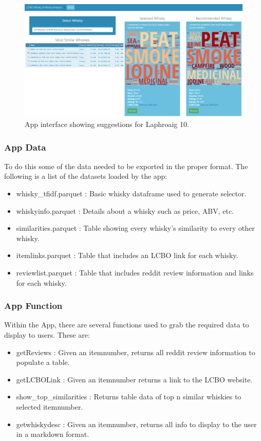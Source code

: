 \documentclass{article}
\begin{document}
\begin{figure}[h]
\includegraphics[width=\textwidth]{app}
\centering
\caption{App interface showing suggestions for Laphroaig 10.}
\label{fig:app}
\end{figure}  


\subsubsection{App Data}
To do this some of the data needed to be exported in the proper format. The following is a list of the datasets loaded by the app:

\begin{itemize}
    \item whisky\_tfidf.parquet : Basic whisky dataframe used to generate selector.
    \item whiskyinfo.parquet : Details about a whisky such as price, ABV, etc.
    \item similarities.parquet : Table showing every whisky's similarity to every other whisky.
    \item itemlinks.parquet : Table that includes an LCBO link for each whisky.
    \item reviewlist.parquet : Table that includes reddit review information and links for each whisky.
\end{itemize}

\subsubsection{App Function}

Within the App, there are several functions used to grab the required data to display to users. These are:

\begin{itemize}
    \item getReviews : Given an itemnumber, returns all reddit review information to populate a table.
    \item getLCBOLink : Given an itemnumber returns a link to the LCBO website.
    \item show\_top\_similarities : Returns table data of top n similar whiskies to selected itemnumber.
    \item getwhiskydesc : Given an itemnumber, returns all info to display to the user in a markdown format.
\end{itemize}
\end{document}
